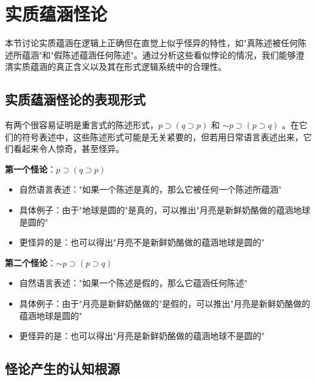 \section{实质蕴涵怪论}

\begin{logicbox}[title=引言]
本节讨论实质蕴涵在逻辑上正确但在直觉上似乎怪异的特性，如"真陈述被任何陈述所蕴涵"和"假陈述蕴涵任何陈述"。通过分析这些看似悖论的情况，我们能够澄清实质蕴涵的真正含义以及其在形式逻辑系统中的合理性。
\end{logicbox}

\subsection{实质蕴涵怪论的表现形式}

有两个很容易证明是重言式的陈述形式，$p \supset(q \supset p)$ 和 $\sim p \supset(p \supset q)$ 。在它们的符号表述中，这些陈述形式可能是无关紧要的，但若用日常语言表述出来，它们看起来令人惊奇，甚至怪异。

\begin{theorembox}[title=实质蕴涵怪论的两个基本形式]
\textbf{第一个怪论}：$p \supset(q \supset p)$
\begin{itemize}
\item 自然语言表述："如果一个陈述是真的，那么它被任何一个陈述所蕴涵"
\item 具体例子：由于"地球是圆的"是真的，可以推出"月亮是新鲜奶酪做的蕴涵地球是圆的"
\item 更怪异的是：也可以得出"月亮不是新鲜奶酪做的蕴涵地球是圆的"
\end{itemize}

\textbf{第二个怪论}：$\sim p \supset(p \supset q)$
\begin{itemize}
\item 自然语言表述："如果一个陈述是假的，那么它蕴涵任何陈述"
\item 具体例子：由于"月亮是新鲜奶酪做的"是假的，可以推出"月亮是新鲜奶酪做的蕴涵地球是圆的"
\item 更怪异的是：也可以得出"月亮是新鲜奶酪做的蕴涵地球不是圆的"
\end{itemize}
\end{theorembox}

\subsection{怪论产生的认知根源}

